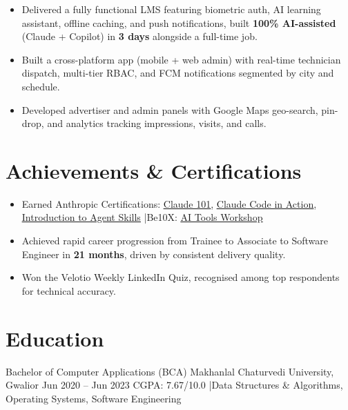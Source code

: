 \documentclass{resume}
\begin{document}
\vspace{3pt}

\begin{itemize}
  \item Delivered a fully functional LMS featuring biometric auth, AI learning assistant, offline caching, and push notifications, built \textbf{100\% AI-assisted} (Claude + Copilot) in \textbf{3 days} alongside a full-time job.
\end{itemize}

\vspace{3pt}

\begin{itemize}
  \item Built a cross-platform app (mobile + web admin) with real-time technician dispatch, multi-tier RBAC, and FCM notifications segmented by city and schedule.
\end{itemize}

\vspace{3pt}

\begin{itemize}
  \item Developed advertiser and admin panels with Google Maps geo-search, pin-drop, and analytics tracking impressions, visits, and calls.
\end{itemize}

\section{Achievements \& Certifications}

\begin{itemize}
  \item Earned Anthropic Certifications: \href{https://verify.skilljar.com/c/738qqbw7mdzg}{\underline{Claude 101}}, \href{https://verify.skilljar.com/c/y7sjp6gizmbk}{\underline{Claude Code in Action}}, \href{https://verify.skilljar.com/c/yhi5c9jiyomj}{\underline{Introduction to Agent Skills}} \enspace|\enspace Be10X: \href{https://certx.in/certificate/0270772f-3809-4400-b29b-1e1c61cd09971132989}{\underline{AI Tools Workshop}}
  \item Achieved rapid career progression from Trainee to Associate to Software Engineer in \textbf{21 months}, driven by consistent delivery quality.
  \item Won the Velotio Weekly LinkedIn Quiz, recognised among top respondents for technical accuracy.
\end{itemize}

\section{Education}

\eduentry
  {Bachelor of Computer Applications (BCA)}
  {Makhanlal Chaturvedi University, Gwalior}
  {Jun 2020 -- Jun 2023}
  {CGPA: 7.67/10.0 \quad|\quad Data Structures \& Algorithms, Operating Systems, Software Engineering}
\end{document}
